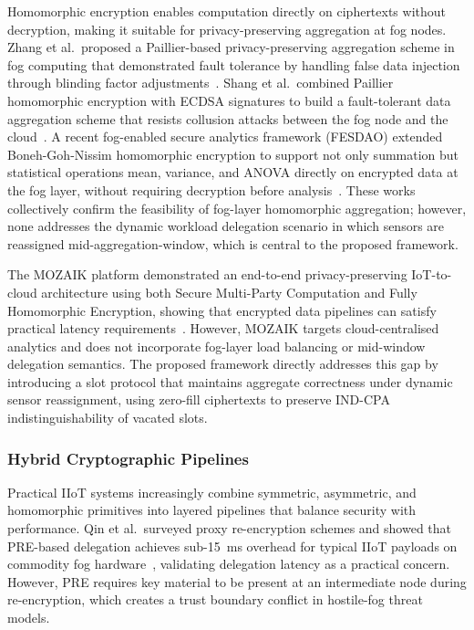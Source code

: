 \documentclass[conference]{IEEEtran}
\begin{document}
Homomorphic encryption enables computation directly on ciphertexts without decryption, making it suitable for privacy-preserving aggregation at fog nodes. Zhang et al.\ proposed a Paillier-based privacy-preserving aggregation scheme in fog computing that demonstrated fault tolerance by handling false data injection through blinding factor adjustments~\cite{zhang2018}. Shang et al.\ combined Paillier homomorphic encryption with ECDSA signatures to build a fault-tolerant data aggregation scheme that resists collusion attacks between the fog node and the cloud~\cite{shang2023}. A recent fog-enabled secure analytics framework (FESDAO) extended Boneh-Goh-Nissim homomorphic encryption to support not only summation but statistical operations mean, variance, and ANOVA directly on encrypted data at the fog layer, without requiring decryption before analysis~\cite{fesdao2025}. These works collectively confirm the feasibility of fog-layer homomorphic aggregation; however, none addresses the dynamic workload delegation scenario in which sensors are reassigned mid-aggregation-window, which is central to the proposed framework.

The MOZAIK platform demonstrated an end-to-end privacy-preserving IoT-to-cloud architecture using both Secure Multi-Party Computation and Fully Homomorphic Encryption, showing that encrypted data pipelines can satisfy practical latency requirements~\cite{januszewicz2025}. However, MOZAIK targets cloud-centralised analytics and does not incorporate fog-layer load balancing or mid-window delegation semantics. The proposed framework directly addresses this gap by introducing a slot protocol that maintains aggregate correctness under dynamic sensor reassignment, using zero-fill ciphertexts to preserve IND-CPA indistinguishability of vacated slots.

\subsubsection{Hybrid Cryptographic Pipelines}

Practical IIoT systems increasingly combine symmetric, asymmetric, and homomorphic primitives into layered pipelines that balance security with performance. Qin et al.\ surveyed proxy re-encryption schemes and showed that PRE-based delegation achieves sub-15~ms overhead for typical IIoT payloads on commodity fog hardware~\cite{qin2022}, validating delegation latency as a practical concern. However, PRE requires key material to be present at an intermediate node during re-encryption, which creates a trust boundary conflict in hostile-fog threat models.
\end{document}
